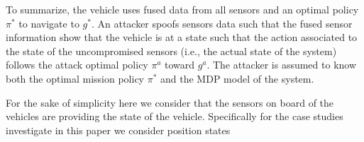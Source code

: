 \documentclass[letterpaper, 10 pt, conference]{ieeeconf}  %
\newcommand\NB[1]{$\spadesuit$\footnote{NB: #1}}
\begin{document}
To summarize, the vehicle uses fused data from all sensors and an optimal policy $\pi^*$ to navigate to $g^*$. An attacker spoofs sensors data such that the fused sensor information show that the vehicle is at a state such that the  action associated to the state of the uncompromised sensors (i.e., the actual state of the system) follows the attack optimal policy $\pi^a$ toward $g^a$. The attacker is assumed to know both the optimal mission policy $\pi^*$ and the MDP model of the system.   

For the sake of simplicity here we consider that the sensors on board of the vehicles are providing the state of the vehicle. Specifically for the case studies investigate in this paper we consider position states

\end{document}
